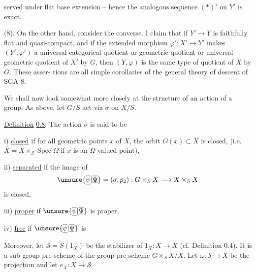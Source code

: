 served under flat base extension -- hence the analogous sequence $(*)'$ on $Y'$ is exact.

(8). On the other hand, consider the converse. I claim that if $Y'\longrightarrow Y$ is faithfully flat and quasi-compact, and if the extended morphism $\varphi':X'\longrightarrow Y'$ makes $(Y',\varphi')$ a universal categorical quotient or geometric quotient or universal geometric quotient of $X'$ by $G$, then $(Y,\varphi)$ is the same type of quotient of $X$ by $G$. These asser-
tions are all simple corollaries of the general theory of descent of SGA 8.

 We shall now look somewhat more closely at the structure of an action of a group. As above, let $G/S$ act via $\sigma$ on $X/S$.

\uline{Definition} \uline{0.8}: The action $\sigma$ is said to be

i) \uline{closed} if for all geometric points $x$ of $X$, the orbit $O(x)\subset\overline X$ is closed, (i.e. $\overline X=X\times_S\operatorname{Spec}\Omega$ if $x$ is an $\Omega$-valued point),

ii) \uline{separated} if the image of
\[
\unsure{\overline{\underline{\psi}}|\overline{\underline{\Psi}}}=(\sigma,p_2):G\times_S X\longrightarrow X\times_S X
\]
is closed,

iii) \uline{proper} if $\unsure{\overline{\underline{\psi}}|\overline{\underline{\Psi}}}$ is proper,

iv) \uline{free} if $\unsure{\overline{\underline{\psi}}|\overline{\underline{\Psi}}}$ is 

Moreover, let $\mathcal S=S(1_X)$ be the stabilizer of $1_X:X\to X$ (cf. Definition 0.4). It is a sub-group pre-scheme of the group pre-scheme $G\times_S X/X$. Let $\overline\omega:\mathcal S\longrightarrow X$ be the projection and let $e_X:X\longrightarrow\mathcal S$
